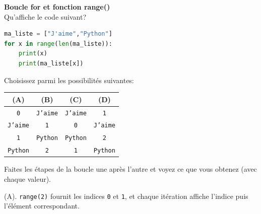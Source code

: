 	\begin{Exercice}[5 minutes] [Python] \textbf{Boucle for et fonction range()}\\
      	Qu'affiche le code suivant?
      	
      	\begin{lstlisting}[language=Python]
ma_liste = ["J'aime","Python"]
for x in range(len(ma_liste)):
    print(x)
    print(ma_liste[x]) \end{lstlisting}
             	
        Choisissez parmi les possibilités suivantes: \\
        \begin{tabular}{|c|c|c|c|}
\hline
(A) & (B) & (C) & (D) \\
\hline
\texttt{0} & \texttt{J'aime} & \texttt{J'aime} & \texttt{1} \\
\texttt{J'aime} & \texttt{1} & \texttt{0} & \texttt{J'aime} \\
\texttt{1} & \texttt{Python} & \texttt{Python} & \texttt{2} \\
\texttt{Python} & \texttt{2} & \texttt{1} & \texttt{Python} \\
\hline
\end{tabular}
    
        \begin{conseil}
		   Faites les étapes de la boucle une après l'autre et voyez ce que vous obtenez (avec chaque valeur).  
        \end{conseil}
        
        \begin{solution}
            (A). \texttt{range(2)} fournit les indices \texttt{0} et \texttt{1}, et chaque itération affiche l'indice puis l'élément correspondant.
        \end{solution}
    \end{Exercice} 		
	
